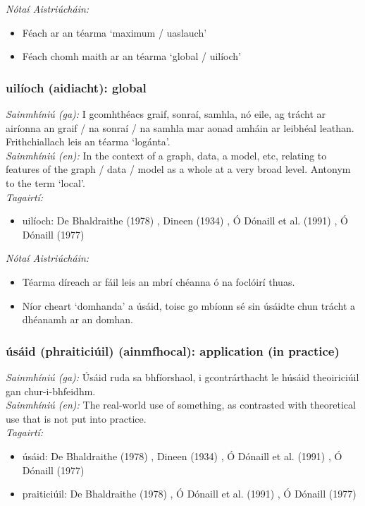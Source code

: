\documentclass{article}
\begin{document}
 \noindent \textit{Nótaí Aistriúcháin:}
\begin{itemize}
	\item Féach ar an téarma `maximum / uaslauch'
	\item Féach chomh maith ar an téarma `global / uilíoch'
\end{itemize}


\subsubsection*{uilíoch (aidiacht): global}
 \noindent \textit{Sainmhíniú (ga):} I gcomhthéacs graif, sonraí, samhla, nó eile, ag trácht ar airíonna an graif / na sonraí / na samhla mar aonad amháin ar leibhéal leathan. Frithchiallach leis an téarma `logánta'.
\\
 \noindent \textit{Sainmhíniú (en):} In the context of a graph, data, a model, etc, relating to features of the graph / data / model as a whole at a very broad level. Antonym to the term `local'.
\\
 \noindent \textit{Tagairtí:}
\begin{itemize}
	\item uilíoch: De Bhaldraithe (1978) \cite{de-bhaldraithe}, Dineen (1934) \cite{dineen}, Ó Dónaill et al. (1991) \cite{focloir-beag}, Ó Dónaill (1977) \cite{odonaill}
\end{itemize}

 \noindent \textit{Nótaí Aistriúcháin:}
\begin{itemize}
	\item Téarma díreach ar fáil leis an mbrí chéanna ó na foclóirí thuas.
	\item Níor cheart `domhanda' a úsáid, toisc go mbíonn sé sin úsáidte chun trácht a dhéanamh ar an domhan.
\end{itemize}


\subsubsection*{úsáid (phraiticiúil) (ainmfhocal): application (in practice)}
 \noindent \textit{Sainmhíniú (ga):} Úsáid ruda sa bhfíorshaol, i gcontrárthacht le húsáid theoiriciúil gan chur-i-bhfeidhm.
\\
 \noindent \textit{Sainmhíniú (en):} The real-world use of something, as contrasted with theoretical use that is not put into practice.
\\
 \noindent \textit{Tagairtí:}
\begin{itemize}
	\item úsáid: De Bhaldraithe (1978) \cite{de-bhaldraithe}, Dineen (1934) \cite{dineen}, Ó Dónaill et al. (1991) \cite{focloir-beag}, Ó Dónaill (1977) \cite{odonaill}
	\item praiticiúil: De Bhaldraithe (1978) \cite{de-bhaldraithe}, Ó Dónaill et al. (1991) \cite{focloir-beag}, Ó Dónaill (1977) \cite{odonaill}
\end{itemize}
\end{document}

